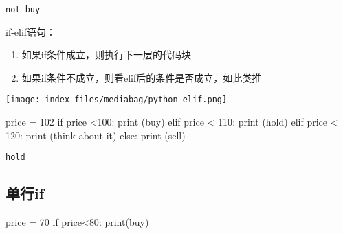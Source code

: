 \documentclass[
  letterpaper,
  DIV=11,
  numbers=noendperiod]{scrreprt}
\newenvironment{Shaded}{\begin{snugshade}}{\end{snugshade}}
\newcommand{\BuiltInTok}[1]{\textcolor[rgb]{0.00,0.23,0.31}{#1}}
\newcommand{\ControlFlowTok}[1]{\textcolor[rgb]{0.00,0.23,0.31}{#1}}
\newcommand{\DecValTok}[1]{\textcolor[rgb]{0.68,0.00,0.00}{#1}}
\newcommand{\NormalTok}[1]{\textcolor[rgb]{0.00,0.23,0.31}{#1}}
\newcommand{\OperatorTok}[1]{\textcolor[rgb]{0.37,0.37,0.37}{#1}}
\newcommand{\StringTok}[1]{\textcolor[rgb]{0.13,0.47,0.30}{#1}}
\providecommand{\tightlist}{%
  \setlength{\itemsep}{0pt}\setlength{\parskip}{0pt}}\usepackage{longtable,booktabs,array}
\begin{document}
\begin{verbatim}
not buy
\end{verbatim}

if-elif语句：

\begin{enumerate}
\def\labelenumi{\arabic{enumi}.}
\tightlist
\item
  如果if条件成立，则执行下一层的代码块
\item
  如果if条件不成立，则看elif后的条件是否成立，如此类推
\end{enumerate}

\texttt{[image: index\_files/mediabag/python-elif.png]}

\begin{Shaded}
\begin{Highlighting}[]
\NormalTok{price }\OperatorTok{=} \DecValTok{102}
\ControlFlowTok{if}\NormalTok{ price }\OperatorTok{\textless{}}\DecValTok{100}\NormalTok{:}
    \BuiltInTok{print}\NormalTok{ (}\StringTok{\textquotesingle{}buy\textquotesingle{}}\NormalTok{)}
\ControlFlowTok{elif}\NormalTok{ price }\OperatorTok{\textless{}} \DecValTok{110}\NormalTok{:}
    \BuiltInTok{print}\NormalTok{ (}\StringTok{\textquotesingle{}hold\textquotesingle{}}\NormalTok{)}
\ControlFlowTok{elif}\NormalTok{ price }\OperatorTok{\textless{}} \DecValTok{120}\NormalTok{:}
    \BuiltInTok{print}\NormalTok{ (}\StringTok{\textquotesingle{}think about it\textquotesingle{}}\NormalTok{)}
\ControlFlowTok{else}\NormalTok{:}
    \BuiltInTok{print}\NormalTok{ (}\StringTok{\textquotesingle{}sell\textquotesingle{}}\NormalTok{)}
\end{Highlighting}
\end{Shaded}

\begin{verbatim}
hold
\end{verbatim}

\hypertarget{ux5355ux884cif}{%
\subsection{单行if}\label{ux5355ux884cif}}

\begin{Shaded}
\begin{Highlighting}[]
\NormalTok{price }\OperatorTok{=} \DecValTok{70}
\ControlFlowTok{if}\NormalTok{ price}\OperatorTok{\textless{}}\DecValTok{80}\NormalTok{: }\BuiltInTok{print}\NormalTok{(}\StringTok{\textquotesingle{}buy\textquotesingle{}}\NormalTok{)}
\end{Highlighting}
\end{Shaded}
\end{document}
